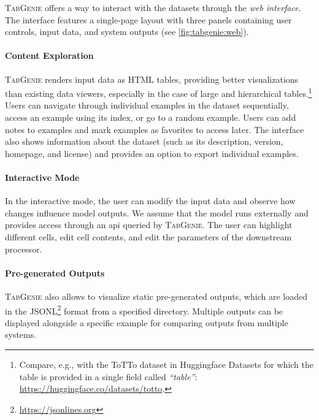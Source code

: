 \textsc{TabGenie} offers a way to interact with the datasets through the \textit{web interface}. The interface features a single-page layout with three panels containing user controls, input data, and system outputs (see \autoref{fig:tabgenie:web}).

\paragraph{Content Exploration} \textsc{TabGenie} renders input data as HTML tables, providing better visualizations than existing data viewers, especially in the case of large and hierarchical tables.\footnote{Compare, e.g., with the ToTTo dataset in Huggingface Datasets for which the table is provided in a single field called \textit{``table''}: \url{https://huggingface.co/datasets/totto}.} Users can navigate through individual examples in the dataset sequentially, access an example using its index, or go to a random example. Users can add notes to examples and mark examples as favorites to access later. The interface also shows information about the dataset (such as its description, version, homepage, and license) and provides an option to export individual examples.

\paragraph{Interactive Mode} In the interactive mode, the user can modify the input data and observe how changes influence model outputs. We assume that the model runs externally and provides access through an \acs{api} queried by \textsc{TabGenie}. The user can highlight different cells, edit cell contents, and edit the parameters of the downstream processor.



\paragraph{Pre-generated Outputs} \textsc{TabGenie} also allows to visualize static pre-generated outputs, which are loaded in the JSONL\footnote{\url{https://jsonlines.org}} format from a specified directory. Multiple outputs can be displayed alongside a specific example for comparing outputs from multiple systems.


